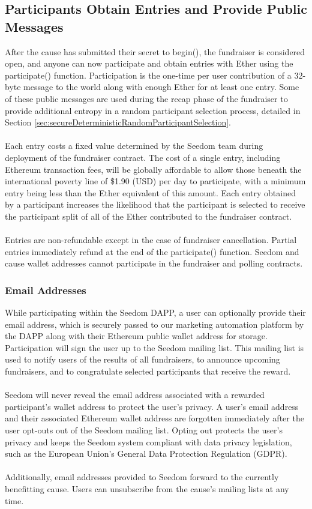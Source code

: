 \documentclass[11pt]{article}
\begin{document}
\subsection{Participants Obtain Entries and Provide Public Messages}

After the cause has submitted their secret to begin(), the fundraiser is considered open, and anyone can now participate and obtain entries with Ether using the participate() function. Participation is the one-time per user contribution of a 32-byte message to the world along with enough Ether for at least one entry. Some of these public messages are used during the recap phase of the fundraiser to provide additional entropy in a random participant selection process, detailed in Section \ref{sec:secureDeterministicRandomParticipantSelection}.\\\\
Each entry costs a fixed value determined by the Seedom team during deployment of the fundraiser contract. The cost of a single entry, including Ethereum transaction fees, will be globally affordable to allow those beneath the international poverty line of \$1.90 (USD) per day \cite{1} to participate, with a minimum entry being less than the Ether equivalent of this amount. Each entry obtained by a participant increases the likelihood that the participant is selected to receive the participant split of all of the Ether contributed to the fundraiser contract.\\\\
Entries are non-refundable except in the case of fundraiser cancellation. Partial entries immediately refund at the end of the participate() function. Seedom and cause wallet addresses cannot participate in the fundraiser and polling contracts.

\subsubsection{Email Addresses}

While participating within the Seedom DAPP, a user can optionally provide their email address, which is securely passed to our marketing automation platform by the DAPP along with their Ethereum public wallet address for storage. Participation will sign the user up to the Seedom mailing list. This mailing list is used to notify users of the results of all fundraisers, to announce upcoming fundraisers, and to congratulate selected participants that receive the reward.\\\\
Seedom will never reveal the email address associated with a rewarded participant's wallet address to protect the user's privacy. A user's email address and their associated Ethereum wallet address are forgotten immediately after the user opt-outs out of the Seedom mailing list. Opting out protects the user's privacy and keeps the Seedom system compliant with data privacy legislation, such as the European Union's General Data Protection Regulation (GDPR).\\\\
Additionally, email addresses provided to Seedom forward to the currently benefitting cause. Users can unsubscribe from the cause's mailing lists at any time.
\end{document}
